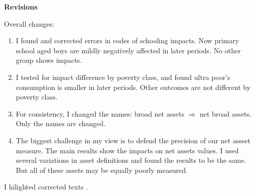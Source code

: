 \newpage
{}






\textbf{\textbf{Revisions}}

\vspace{2ex}
Overall changes:
\begin{enumerate}
\vspace{1.0ex}\setlength{\itemsep}{1.0ex}\setlength{\baselineskip}{12pt}
\item	I found and corrected errors in codes of schooling impacts. Now primary school aged boys are mildly negatively affected in later periods. No other group shows impacts.
\item	I tested for impact difference by poverty class, and found ultra poor's consumption is smaller in later periods. Other outcomes are not different by poverty class.
\item	For consistency, I changed the names: broad net assets $\Rightarrow$ net broad assets. Only the names are changed.
\item	The biggest challenge in my view is to defend the precision of our net assset measure. The main results show the impacts on net assets values. I used several variations in asset definitions and found the results to be the same. But all of these assets may be equally poorly measured. 
\end{enumerate}

I hilighted corrected texts .

